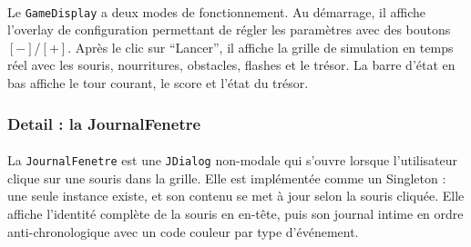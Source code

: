 \paragraph{} Le \texttt{GameDisplay} a deux modes de fonctionnement. Au démarrage, il affiche l'overlay de configuration permettant de régler les paramètres avec des boutons $[-]$/$[+]$. Après le clic sur ``Lancer'', il affiche la grille de simulation en temps réel avec les souris, nourritures, obstacles, flashes et le trésor. La barre d'état en bas affiche le tour courant, le score et l'état du trésor.

\bigskip

\subsubsection{Detail : la JournalFenetre}

\paragraph{} La \texttt{JournalFenetre} est une \texttt{JDialog} non-modale qui s'ouvre lorsque l'utilisateur clique sur une souris dans la grille. Elle est implémentée comme un Singleton : une seule instance existe, et son contenu se met à jour selon la souris cliquée. Elle affiche l'identité complète de la souris en en-tête, puis son journal intime en ordre anti-chronologique avec un code couleur par type d'événement.

